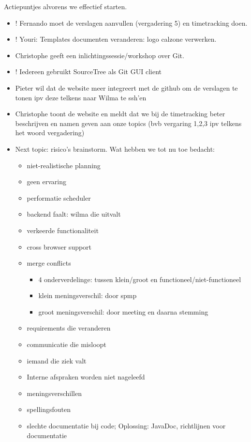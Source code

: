 Actiepuntjes alvorens we effectief starten.
\begin{itemize}
\item ! Fernando moet de verslagen aanvullen (vergadering 5) en timetracking doen.
\item ! Youri: Templates documenten veranderen: logo calzone verwerken.
\end{itemize}

\begin{itemize}
\item Christophe geeft een inlichtingssessie/workshop over Git. 
\item ! Iedereen gebruikt SourceTree als Git GUI client
\item Pieter wil dat de website meer integreert met de github om de verslagen te tonen ipv deze telkens naar Wilma te ssh'en
\item Christophe toont de website en meldt dat we bij de timetracking beter beschrijven en namen geven aan onze topics (bvb vergaring 1,2,3 ipv telkens het woord vergadering)
\item Next topic: risico's brainstorm. Wat hebben we tot nu toe bedacht:
	\begin{itemize}
	\item niet-realistische planning
	\item geen ervaring
	\item performatie scheduler
	\item backend faalt: wilma die uitvalt
	\item verkeerde functionaliteit
	\item cross browser support
	\item merge conflicts
		\begin{itemize}
		\item 4 onderverdelinge: tussen klein/groot en functioneel/niet-functioneel
		\item klein meningsverschil: door spmp
		\item groot meningsverschil: door meeting en daarna stemming
		\end{itemize}
	\item requirements die veranderen
	\item communicatie die misloopt
	\item iemand die ziek valt
	\item Interne afspraken worden niet nageleefd
	\item meningsverschillen
	\item spellingsfouten
	\item slechte documentatie bij code; Oplossing: JavaDoc, richtlijnen voor documentatie

\end{itemize}
\end{itemize}
